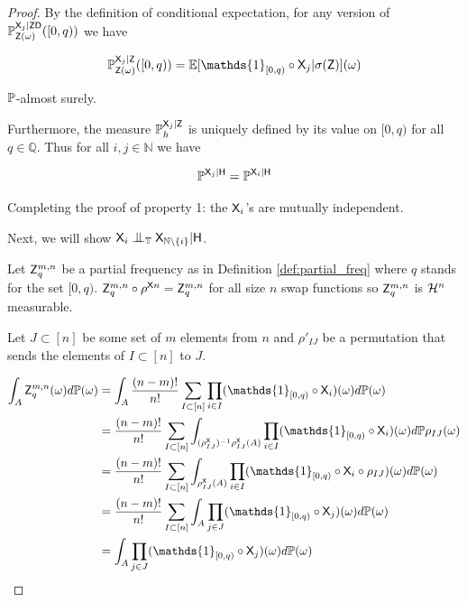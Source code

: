 \begin{proof}
By the definition of conditional expectation, for any version of $\mathbb{P}_{\mathsf{Z}(\omega)}^{\mathsf{X}_j|\mathsf{Z}\mathsf{D}}([0,q))$ we have

\begin{align}
    \prob{P}_{\RV{Z}(\omega)}^{\RV{X}_j|\RV{Z}}([0,q)) &= \mathbb{E}[\mathds{1}_{[0,q)}\circ \RV{X}_j|\sigma(\RV{Z})](\omega)\\
\end{align}

$\mathbb{P}$-almost surely.

Furthermore, the measure $\mathbb{P}_{h}^{\mathsf{X}_j|\mathsf{Z}}$ is uniquely defined by its value on $[0,q)$ for all $q\in \mathbb{Q}$. Thus for all $i,j\in \mathbb{N}$ we have

\begin{align}
    \mathbb{P}^{\mathsf{X}_j|\mathsf{H}} = \mathbb{P}^{\mathsf{X}_i|\mathsf{H}}
\end{align}

Completing the proof of property 1: the $\mathsf{X}_i$'s are mutually independent.

Next, we will show $\RV{X}_i\CI_\kernel{T} \RV{X}_{\mathbb{N}\setminus \{i\}} | \RV{H}$.

Let $\mathsf{Z}^{m,n}_q$ be a partial frequency as in Definition \ref{def:partial_freq} where $q$ stands for the set $[0,q)$. $\mathsf{Z}^{m,n}_q\circ \rho^{\mathsf{X}n}=\mathsf{Z}^{m,n}_q$ for all size $n$ swap functions so $\mathsf{Z}^{m,n}_q$  is $\mathcal{H}^n$ measurable.

Let $J\subset[n]$ be some set of $m$ elements from $n$ and $\rho'_{IJ}$ be a permutation that sends the elements of $I\subset[n]$ to $J$.

\begin{align}
    \int_{A} \RV{Z}_q^{m,n} (\omega) d\prob{P}(\omega) &= \int_{A} \frac{(n-m)!}{n!}\sum_{I\subset[n]}\prod_{i\in I} (\mathds{1}_{[0,q)}\circ \RV{X}_i)(\omega)d\prob{P}(\omega)\\
    &= \frac{(n-m)!}{n!}\sum_{I\subset[n]} \int_{(\rho^{\RV{X}}_{IJ})^{-1}\rho^{\RV{X}}_{IJ}(A)} \prod_{i\in I}(\mathds{1}_{[0,q)}\circ \RV{X}_i)(\omega)d\prob{P}\rho_{IJ}(\omega)\\
    &= \frac{(n-m)!}{n!}\sum_{I\subset[n]} \int_{\rho^{\RV{X}}_{IJ}(A)} \prod_{i\in I}(\mathds{1}_{[0,q)}\circ \RV{X}_{i}\circ \rho_{IJ}) (\omega)d\prob{P}(\omega)\label{eq:using_pushforward}\\
    &= \frac{(n-m)!}{n!}\sum_{I\subset[n]} \int_{A} \prod_{j\in J}(\mathds{1}_{[0,q)}\circ \RV{X}_{j})(\omega)d\prob{P}(\omega)\label{eq:closure_under_permutation2}\\
    &= \int_{A} \prod_{j\in J}(\mathds{1}_{[0,q)} \circ \RV{X}_j)(\omega)d\prob{P}(\omega) \label{eq:cond_expectation_first2}
\end{align}


\end{proof}
